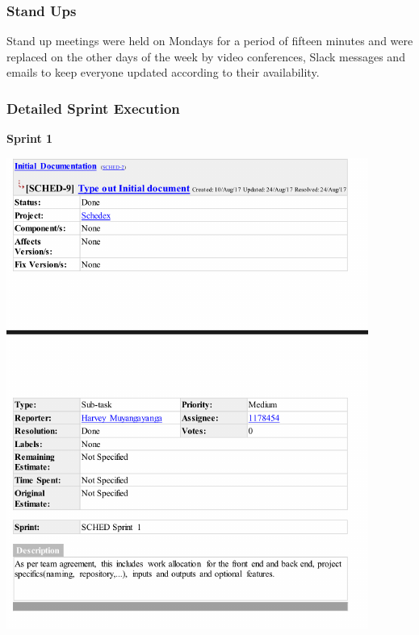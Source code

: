 \documentclass{article}
\begin{document}
\subsubsection{Stand Ups}
Stand up meetings were held on Mondays for a period of fifteen minutes and were replaced on the other days of the week by video conferences, Slack messages and emails to keep everyone updated according to their availability.

\subsubsection{Detailed Sprint Execution}

\textbf{Sprint 1}

\centerline{\includegraphics[scale=1]{sprint1_1}}
\end{document}
